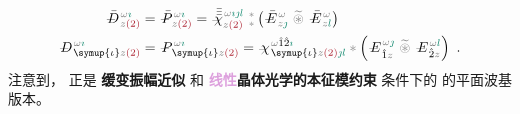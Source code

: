 \begin{subequations} \label{eq:DP^(2)-plane_wave_basis-p_pp}
\begin{align}
	\xint{\mathcolor{gray}{-}}{30}{\bar{D}}^{\;\! \mathcolor{gray}{\omega} \textcolor{PineGreen}{\imath}}_{\;\! \mathcolor{gray}{z} \textcolor{Maroon}{(2)}} &= \xint{\mathcolor{gray}{-}}{30}{\bar{P}}^{\;\! \mathcolor{gray}{\omega} \textcolor{PineGreen}{\imath}}_{\;\! \mathcolor{gray}{z} \textcolor{Maroon}{(2)}} = \xint{{}^{}_{\mathcolor{gray}{-}}}{23}{\bar{\bar{\bar{\chi}}}}^{\;\! \mathcolor{gray}{\omega} \textcolor{PineGreen}{\imath \jmath l}}_{\mathcolor{gray}{z} \textcolor{Maroon}{(2)}} ~{}^{\mathcolor{gray}{*}}_{\mathcolor{gray}{*}} \left( \xint{\mathcolor{gray}{-}}{295}{\bar{E}}^{\;\!\mathcolor{gray}{\omega}}_{\;\! \mathcolor{gray}{z} \textcolor{PineGreen}{\jmath} } ~\mathcolor{gray}{\widetilde \circledast}~ \xint{\mathcolor{gray}{-}}{295}{\bar{E}}^{\;\!\mathcolor{gray}{\omega}}_{\;\! \mathcolor{gray}{z} \textcolor{PineGreen}{l} } \right) \label{eq:vec-DP^(2)-plane_wave_basis-p_pp} \\
	\xint{\mathcolor{gray}{-}}{30}{D}^{\;\! \mathcolor{gray}{\omega} \textcolor{PineGreen}{\imath}}_{\;\! \symup{\iota}\mathcolor{gray}{z} \textcolor{Maroon}{(2)}} &= \xint{\mathcolor{gray}{-}}{30}{P}^{\;\! \mathcolor{gray}{\omega} \textcolor{PineGreen}{\imath}}_{\;\! \symup{\iota}\mathcolor{gray}{z} \textcolor{Maroon}{(2)}} = \xint{{}^{}_{\mathcolor{gray}{-}}}{23}{\chi}^{\;\! \mathcolor{gray}{\omega} \hat{1} \hat{2} \textcolor{PineGreen}{\imath}}_{\;\! \symup{\iota} \mathcolor{gray}{z} \textcolor{Maroon}{(2)} \textcolor{PineGreen}{\jmath l}} \mathcolor{gray}{*} \left( \xint{\mathcolor{gray}{-}}{295}{E}^{\;\!\mathcolor{gray}{\omega} \textcolor{PineGreen}{\jmath}}_{\;\! \hat{1} \mathcolor{gray}{z}} ~\mathcolor{gray}{\widetilde \circledast}~ \xint{\mathcolor{gray}{-}}{295}{E}^{\;\!\mathcolor{gray}{\omega} \textcolor{PineGreen}{l}}_{\;\! \hat{2} \mathcolor{gray}{z}} \right) ~. \label{eq:components-DP^(2)-plane_wave_basis-p_pp}
\end{align}
\end{subequations}
注意到， 正是 \textbf{\textcolor{NavyBlue}{缓变振幅}近似} 和 \textbf{\textcolor{Plum}{线性}\textcolor{PineGreen}{晶体光学}的\textcolor{PineGreen}{本征模}约束}  条件下的  的\textcolor{PineGreen}{平面波基}版本。

